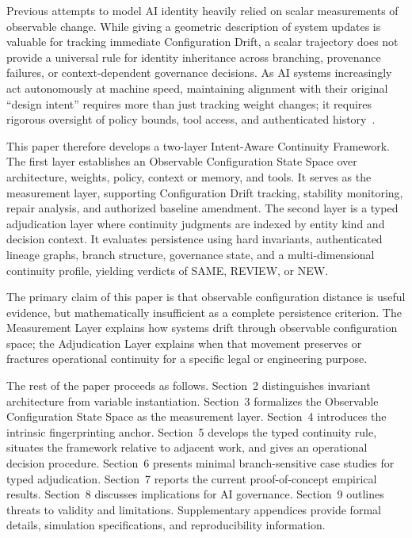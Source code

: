 \documentclass[11pt,a4paper]{article}
\begin{document}
Previous attempts to model AI identity heavily relied on scalar measurements of observable change. While giving a geometric description of system updates is valuable for tracking immediate Configuration Drift, a scalar trajectory does not provide a universal rule for identity inheritance across branching, provenance failures, or context-dependent governance decisions. As AI systems increasingly act autonomously at machine speed, maintaining alignment with their original ``design intent'' requires more than just tracking weight changes; it requires rigorous oversight of policy bounds, tool access, and authenticated history~\cite{ngo2022}.

This paper therefore develops a two-layer Intent-Aware Continuity Framework. The first layer establishes an Observable Configuration State Space over architecture, weights, policy, context or memory, and tools. It serves as the measurement layer, supporting Configuration Drift tracking, stability monitoring, repair analysis, and authorized baseline amendment. The second layer is a typed adjudication layer where continuity judgments are indexed by entity kind and decision context. It evaluates persistence using hard invariants, authenticated lineage graphs, branch structure, governance state, and a multi-dimensional continuity profile, yielding verdicts of SAME, REVIEW, or NEW.

The primary claim of this paper is that observable configuration distance is useful evidence, but mathematically insufficient as a complete persistence criterion. The Measurement Layer explains how systems drift through observable configuration space; the Adjudication Layer explains when that movement preserves or fractures operational continuity for a specific legal or engineering purpose.

The rest of the paper proceeds as follows. Section~2 distinguishes invariant architecture from variable instantiation. Section~3 formalizes the Observable Configuration State Space as the measurement layer. Section~4 introduces the intrinsic fingerprinting anchor. Section~5 develops the typed continuity rule, situates the framework relative to adjacent work, and gives an operational decision procedure. Section~6 presents minimal branch-sensitive case studies for typed adjudication. Section~7 reports the current proof-of-concept empirical results. Section~8 discusses implications for AI governance. Section~9 outlines threats to validity and limitations. Supplementary appendices provide formal details, simulation specifications, and reproducibility information.
\end{document}
